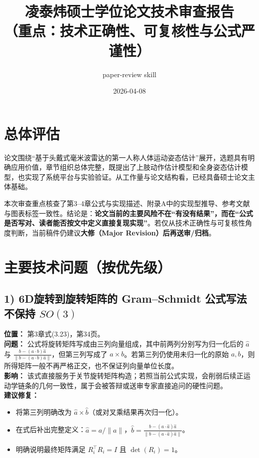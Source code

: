 \documentclass[12pt]{ctexart}
\title{凌泰炜硕士学位论文技术审查报告\\（重点：技术正确性、可复核性与公式严谨性）}
\author{paper-review skill}
\date{2026-04-08}
\begin{document}
\maketitle

\section*{总体评估}
论文围绕“基于头戴式毫米波雷达的第一人称人体运动姿态估计”展开，选题具有明确应用价值，章节组织总体完整，既提出了上肢动作估计模型和全身姿态估计模型，也实现了系统平台与实验验证。从工作量与论文结构看，已经具备硕士论文主体基础。

本次审查重点核查了第3--4章公式与实现描述、附录A中的实现型推导、参考文献与图表标签一致性。结论是：\textbf{论文当前的主要风险不在“有没有结果”，而在“公式是否写对、读者能否按文中定义直接复现实现”}。若仅从技术正确性与可复核性角度判断，当前稿件仍建议\textbf{大修（Major Revision）后再送审/归档}。

\section*{主要技术问题（按优先级）}

\subsection*{1) 6D旋转到旋转矩阵的 Gram--Schmidt 公式写法不保持 \(SO(3)\)}
\textbf{位置：} 第3章式(3.23)，第34页。\\
\textbf{问题：} 公式将旋转矩阵写成由三列向量组成，其中前两列分别写为归一化后的 \(\hat a\) 与
\(
\frac{b-(a\cdot b)\hat a}{\lVert b-(a\cdot b)\hat a\rVert}
\)，但第三列写成了 \(a\times b\)。若第三列仍使用未归一化的原始 \(a,b\)，则所得矩阵一般不再严格正交，也不保证列向量单位长度。\\
\textbf{影响：} 该式直接服务于关节旋转矩阵构造；若照当前公式实现，会削弱后续正运动学链条的几何一致性，属于会被答辩或送审专家直接追问的硬性问题。\\
\textbf{建议修复：}
\begin{itemize}
  \item 将第三列明确改为 \(\hat a\times \hat b\)（或对叉乘结果再次归一化）。
  \item 在式后补出完整定义：\(\hat a=a/\lVert a\rVert\)，\(\hat b=\frac{b-(a\cdot \hat a)\hat a}{\lVert b-(a\cdot \hat a)\hat a\rVert}\)。
  \item 明确说明最终矩阵满足 \(R_i^\top R_i=I\) 且 \(\det(R_i)=1\)。
\end{itemize}
\end{document}
